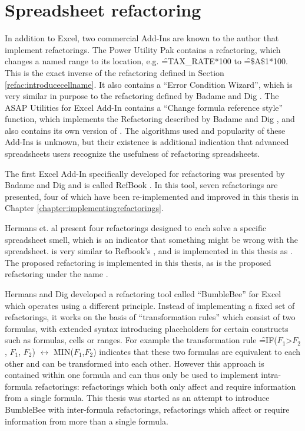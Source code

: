\section{Spreadsheet refactoring}

In addition to Excel, two commercial Add-Ins are known to the author that implement refactorings.
The Power Utility Pak \cite{PuPv7} contains a  refactoring, which changes a named range to its location, e.g. \f{=TAX_RATE*100} to \f{=\$A\$1*100}.
This is the exact inverse of the  refactoring defined in Section \ref{refac:introducecellname}.
It also contains a ``Error Condition Wizard'', which is very similar in purpose to the  refactoring defined by Badame and Dig \cite{badame2012refactoring}.
The ASAP Utilities for Excel \cite{ASAP5} Add-In contains a ``Change formula reference style'' function, which implements the  Refactoring described by Badame and Dig \cite{badame2012refactoring}, and also contains its own version of .
The algorithms used and popularity of these Add-Ins is unknown, but their existence is additional indication that advanced spreadsheets users recognize the usefulness of refactoring spreadsheets.

The first Excel Add-In specifically developed for refactoring was presented by Badame and Dig and is called RefBook \cite{badame2012refactoring}.
In this tool, seven refactorings are presented, four of which have been re-implemented and improved in this thesis in Chapter \ref{chapter:implementingrefactorings}.

Hermans et. al \cite{hermans2014detecting} present four refactorings designed to each solve a specific spreadsheet smell, which is an indicator that something might be wrong with the spreadsheet.
 is very similar to Refbook's , and is implemented in this thesis as .
The proposed  refactoring is implemented in this thesis, as is the proposed  refactoring under the name .

\newpage

Hermans and Dig \cite{hermans2014bumblebee} developed a refactoring tool called ``BumbleBee'' for Excel which operates using a different principle.
Instead of implementing a fixed set of refactorings, it works on the basis of  ``transformation rules'' which consist of two formulas, with extended syntax introducing placeholders for certain constructs such as formulas, cells or ranges.
For example the transformation rule \f{=IF($F_1$>$F_2$, $F_1$, $F_2$)} $\leftrightarrow$ \f{MIN($F_1$,$F_2$)} indicates that these two formulas are equivalent to each other and can be transformed into each other.
However this approach is contained within one formula and can thus only be used to implement intra-formula refactorings: refactorings which both only affect and require information from a single formula.
This thesis was started as an attempt to introduce BumbleBee with inter-formula refactorings, refactorings which affect or require information from more than a single formula.

